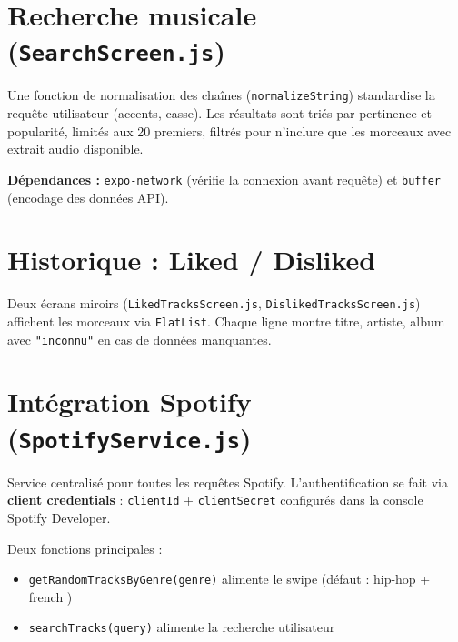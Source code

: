 \documentclass[11pt,a4paper]{article}
\begin{document}
\section{Recherche musicale (\texttt{SearchScreen.js})}

Une fonction de normalisation des chaînes (\texttt{normalizeString}) standardise la requête utilisateur (accents, casse). Les résultats sont triés par pertinence et popularité, limités aux 20 premiers, filtrés pour n'inclure que les morceaux avec extrait audio disponible.

\textbf{Dépendances :} \texttt{expo-network} (vérifie la connexion avant requête) et \texttt{buffer} (encodage des données API).

\section{Historique : Liked / Disliked}

Deux écrans miroirs (\texttt{LikedTracksScreen.js}, \texttt{DislikedTracksScreen.js}) affichent les morceaux via \texttt{FlatList}. Chaque ligne montre titre, artiste, album \textemdash{} avec \texttt{"inconnu"} en cas de données manquantes.

\section{Intégration Spotify (\texttt{SpotifyService.js})}

Service centralisé pour toutes les requêtes Spotify. L'authentification se fait via \textbf{client credentials} : \texttt{clientId} + \texttt{clientSecret} configurés dans la console Spotify Developer.


Deux fonctions principales :
\begin{itemize}
  \item \texttt{getRandomTracksByGenre(genre)} \textemdash{} alimente le swipe (défaut : \og hip-hop \fg{} + \og french \fg{})
  \item \texttt{searchTracks(query)} \textemdash{} alimente la recherche utilisateur
\end{itemize}
\end{document}
